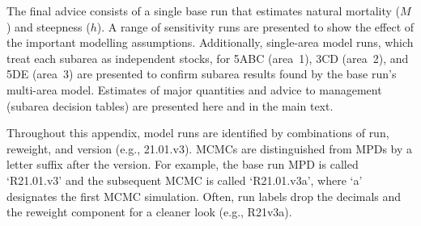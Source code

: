 \documentclass[11pt]{book}
\begin{document}
The final advice consists of a single base run that estimates natural mortality ($M$) and steepness ($h$).
A range of sensitivity runs are presented to show the effect of the important modelling assumptions.
Additionally, single-area model runs, which treat each subarea as independent stocks, for 5ABC (area~1), 3CD (area~2), and 5DE (area~3) are presented to confirm subarea results found by the base run's multi-area model.
Estimates of major quantities and advice to management (subarea decision tables) are presented here and in the main text.

Throughout this appendix, model runs are identified by combinations of run, reweight, and version (e.g., 21.01.v3).
MCMCs are distinguished from MPDs by a letter suffix after the version.
For example, the base run MPD is called `R21.01.v3' and the subsequent MCMC is called `R21.01.v3a', where `a' designates the first MCMC simulation.
Often, run labels drop the decimals and the reweight component for a cleaner look (e.g., R21v3a).


\renewcommand*{\arraystretch}{1.1}%

\newcommand{\nChains}{8}%
\newcommand{\Nmcmc}{2,000}%
\newcommand{\Nbase}{2,000}%
\newcommand{\nSimsBase}{40,000}%
\newcommand{\nSampBase}{20,000}%
\newcommand{\cSimsBase}{5,000}%
\newcommand{\cBurnBase}{2,500}%
\newcommand{\cSampBase}{2,500}%
\newcommand{\nThinBase}{10}%
\newcommand{\nSimsArea}{40,000}%
\newcommand{\nSampArea}{20,000}%
\newcommand{\cSimsArea}{5,000}%
\newcommand{\cBurnArea}{2,500}%
\newcommand{\cSampArea}{2,500}%
\newcommand{\nThinArea}{10}%
\newcommand{\nSimsSens}{20,000}%
\newcommand{\nSampSens}{10,000}%
\newcommand{\cSimsSens}{2,500}%
\newcommand{\cBurnSens}{1,250}%
\newcommand{\cSampSens}{1,250}%
\newcommand{\nThinSens}{5}%
\end{document}

